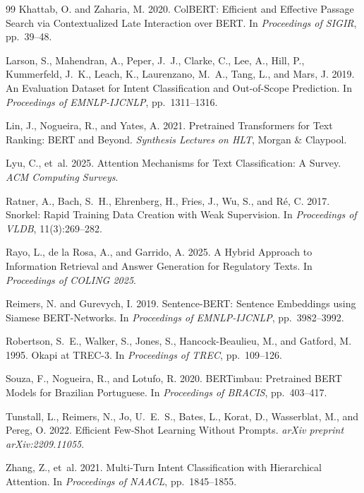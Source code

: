\documentclass[11pt]{article}
\begin{document}
\begin{thebibliography}{99}
Khattab, O. and Zaharia, M. 2020.
\newblock ColBERT: Efficient and Effective Passage Search via Contextualized Late Interaction over BERT.
\newblock In \emph{Proceedings of SIGIR}, pp.~39--48.

Larson, S., Mahendran, A., Peper, J.~J., Clarke, C., Lee, A., Hill, P., Kummerfeld, J.~K., Leach, K., Laurenzano, M.~A., Tang, L., and Mars, J. 2019.
\newblock An Evaluation Dataset for Intent Classification and Out-of-Scope Prediction.
\newblock In \emph{Proceedings of EMNLP-IJCNLP}, pp.~1311--1316.

Lin, J., Nogueira, R., and Yates, A. 2021.
\newblock Pretrained Transformers for Text Ranking: BERT and Beyond.
\newblock \emph{Synthesis Lectures on HLT}, Morgan \& Claypool.

Lyu, C., et~al. 2025.
\newblock Attention Mechanisms for Text Classification: A Survey.
\newblock \emph{ACM Computing Surveys}.

Ratner, A., Bach, S.~H., Ehrenberg, H., Fries, J., Wu, S., and R\'{e}, C. 2017.
\newblock Snorkel: Rapid Training Data Creation with Weak Supervision.
\newblock In \emph{Proceedings of VLDB}, 11(3):269--282.

Rayo, L., de la Rosa, A., and Garrido, A. 2025.
\newblock A Hybrid Approach to Information Retrieval and Answer Generation for Regulatory Texts.
\newblock In \emph{Proceedings of COLING 2025}.

Reimers, N. and Gurevych, I. 2019.
\newblock Sentence-BERT: Sentence Embeddings using Siamese BERT-Networks.
\newblock In \emph{Proceedings of EMNLP-IJCNLP}, pp.~3982--3992.

Robertson, S.~E., Walker, S., Jones, S., Hancock-Beaulieu, M., and Gatford, M. 1995.
\newblock Okapi at TREC-3.
\newblock In \emph{Proceedings of TREC}, pp.~109--126.

Souza, F., Nogueira, R., and Lotufo, R. 2020.
\newblock BERTimbau: Pretrained BERT Models for Brazilian Portuguese.
\newblock In \emph{Proceedings of BRACIS}, pp.~403--417.

Tunstall, L., Reimers, N., Jo, U.~E.~S., Bates, L., Korat, D., Wasserblat, M., and Pereg, O. 2022.
\newblock Efficient Few-Shot Learning Without Prompts.
\newblock \emph{arXiv preprint arXiv:2209.11055}.

Zhang, Z., et~al. 2021.
\newblock Multi-Turn Intent Classification with Hierarchical Attention.
\newblock In \emph{Proceedings of NAACL}, pp.~1845--1855.

\end{thebibliography}
\endgroup
\end{document}
